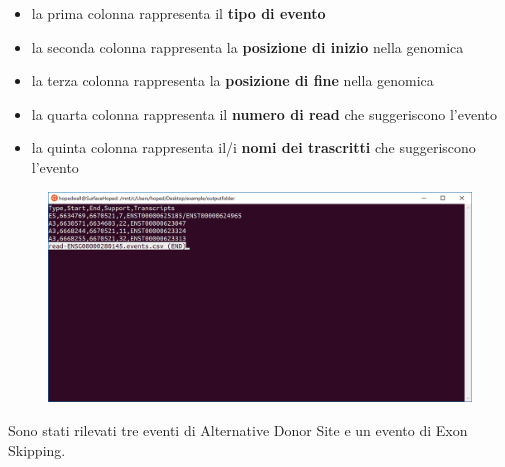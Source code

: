 \begin{itemize}
	\item la prima colonna rappresenta il \textbf{tipo di evento}
	\item la seconda colonna rappresenta la \textbf{posizione di inizio} nella genomica
	\item	la terza colonna rappresenta la \textbf{posizione di fine} nella genomica
	\item la quarta colonna rappresenta il \textbf{numero di read} che suggeriscono l'evento
	\item la quinta colonna rappresenta il/i \textbf{nomi dei trascritti} che suggeriscono l'evento
\end{itemize}

\begin{figure}[h!]
	\centering
	\includegraphics[width=\linewidth]{images/results.png}
  \label{fig:Parameters}
\end{figure}

Sono stati rilevati tre eventi di Alternative Donor Site e un evento di Exon Skipping.

\newpage